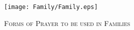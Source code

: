 \fancyhead[RE,LO]{}\fancyhead[RO,LE]{}
\fancyhead[C]{}\thispagestyle{empty}
{}

\begin{figure}[H]
    \centering
    \texttt{[image: Family/Family.eps]}
    \caption{\textsc{\Huge{Forms of Prayer to be used in Families}}}
\end{figure}